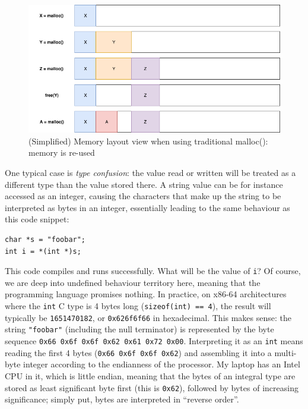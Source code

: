 \begin{figure}
	\centering
	\includegraphics[width=\textwidth]{img/normal_malloc.png}
	\caption{(Simplified) Memory layout view when using traditional malloc(): memory is re-used}
	\label{fig:normal_malloc}
\end{figure}

One typical case is \emph{type confusion}: the value read or written will be treated as a different type than the value stored there. A string value can be for instance accessed as an integer, causing the characters that make up the string to be interpreted as bytes in an integer, essentially leading to the same behaviour as this code snippet:

\begin{lstlisting}
char *s = "foobar";
int i = *(int *)s;
\end{lstlisting}

This code compiles and runs successfully. What will be the value of \lstinline!i!? Of course, we are deep into undefined behaviour territory here, meaning that the programming language promises nothing. In practice, on x86-64 architectures where the \lstinline!int! C type is 4 bytes long (\lstinline!sizeof(int) == 4!), the result will typically be \texttt{1651470182}, or \texttt{0x626f6f66} in hexadecimal. This makes sense: the string \lstinline!"foobar"! (including the null terminator) is represented by the byte sequence \texttt{0x66 0x6f 0x6f 0x62 0x61 0x72 0x00}. Interpreting it as an \lstinline!int! means reading the first 4 bytes (\texttt{0x66 0x6f 0x6f 0x62}) and assembling it into a multi-byte integer according to the endianness of the processor. My laptop has an Intel CPU in it, which is little endian, meaning that the bytes of an integral type are stored as least significant byte first (this is \texttt{0x62}), followed by bytes of increasing significance; simply put, bytes are interpreted in ``reverse order''.


